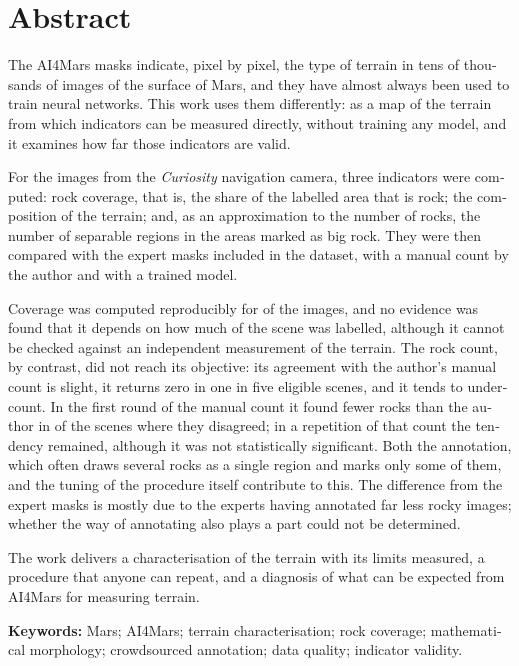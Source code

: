 \chapter*{Abstract}

\begin{otherlanguage}{english}
{\decimalpoint{}

The AI4Mars masks indicate, pixel by pixel, the type of terrain in tens of thousands of images
of the surface of Mars, and they have almost always been used to train neural networks. This
work uses them differently: as a map of the terrain from which indicators can be measured
directly, without training any model, and it examines how far those indicators are valid.

For the \cNEscenas{} images from the \textit{Curiosity} navigation camera, three indicators were
computed: rock coverage, that is, the share of the labelled area that is rock; the composition
of the terrain; and, as an approximation to the number of rocks, the number of separable regions
in the areas marked as big rock. They were
then compared with the expert masks included in the dataset, with a manual count by the author
and with a trained model.

Coverage was computed reproducibly for \cPctCobCalc{} of the images, and no evidence was found
that it depends on how much of the scene was labelled, although it cannot be checked against an
independent measurement of the terrain. The rock count, by contrast, did not reach its
objective: its agreement with the author's manual count is slight, it returns zero in one in five
eligible scenes, and it tends to undercount. In the first round of the manual count it found
fewer rocks than the author in \cVAbajo{} of the \cVDesac{} scenes where they disagreed; in a repetition of that
count the tendency remained, although it was not statistically significant. Both the annotation,
which often draws several rocks as a single region and marks only some of them, and the tuning
of the procedure itself contribute to this. The difference from the expert masks is mostly due to
the experts having annotated far less rocky images; whether the way of annotating also plays a
part could not be determined.

The work delivers a characterisation of the terrain with its limits measured, a procedure that
anyone can repeat, and a diagnosis of what can be expected from AI4Mars for measuring terrain.

\vspace{0.4cm}
\noindent
\textbf{Keywords:} Mars; AI4Mars; terrain characterisation; rock coverage; mathematical
morphology; crowdsourced annotation; data quality; indicator validity.
}
\end{otherlanguage}
